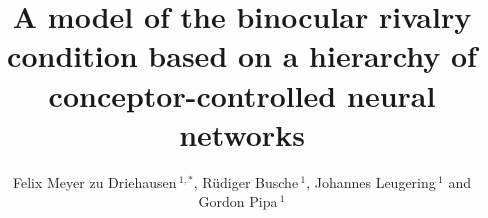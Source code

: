 \documentclass[utf8]{frontiersSCNS} %
\def\firstAuthorLast{Meyer zu Driehausen {et~al.}} %
\def\Authors{Felix Meyer zu Driehausen\,$^{1,*}$, Rüdiger Busche\,$^{1}$, Johannes Leugering\,$^{1}$ and Gordon Pipa\,$^1$}
\begin{document}
\onecolumn
{}

\title[Binocular Rivalry in Conceptor networks]{A model of the binocular rivalry condition based on a hierarchy of conceptor-controlled neural networks} 

\author[\firstAuthorLast ]{\Authors} %
\address{} %
\correspondance{} %

\extraAuth{}%


\maketitle

\end{document}
